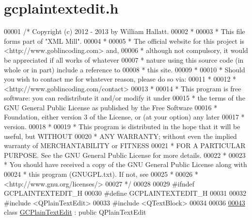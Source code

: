 \hypertarget{gcplaintextedit_8h_source}{\section{gcplaintextedit.\-h}
}

\begin{DoxyCode}
00001 \textcolor{comment}{/* Copyright (c) 2012 - 2013 by William Hallatt.}
00002 \textcolor{comment}{ *}
00003 \textcolor{comment}{ * This file forms part of "XML Mill".}
00004 \textcolor{comment}{ *}
00005 \textcolor{comment}{ * The official website for this project is <http://www.goblincoding.com> and,}
00006 \textcolor{comment}{ * although not compulsory, it would be appreciated if all works of whatever}
00007 \textcolor{comment}{ * nature using this source code (in whole or in part) include a reference to}
00008 \textcolor{comment}{ * this site.}
00009 \textcolor{comment}{ *}
00010 \textcolor{comment}{ * Should you wish to contact me for whatever reason, please do so via:}
00011 \textcolor{comment}{ *}
00012 \textcolor{comment}{ *                 <http://www.goblincoding.com/contact>}
00013 \textcolor{comment}{ *}
00014 \textcolor{comment}{ * This program is free software: you can redistribute it and/or modify it
       under}
00015 \textcolor{comment}{ * the terms of the GNU General Public License as published by the Free
       Software}
00016 \textcolor{comment}{ * Foundation, either version 3 of the License, or (at your option) any later}
00017 \textcolor{comment}{ * version.}
00018 \textcolor{comment}{ *}
00019 \textcolor{comment}{ * This program is distributed in the hope that it will be useful, but WITHOUT}
00020 \textcolor{comment}{ * ANY WARRANTY; without even the implied warranty of MERCHANTABILITY or
       FITNESS}
00021 \textcolor{comment}{ * FOR A PARTICULAR PURPOSE.  See the GNU General Public License for more
       details.}
00022 \textcolor{comment}{ *}
00023 \textcolor{comment}{ * You should have received a copy of the GNU General Public License along with}
00024 \textcolor{comment}{ * this program (GNUGPL.txt).  If not, see}
00025 \textcolor{comment}{ *}
00026 \textcolor{comment}{ *                    <http://www.gnu.org/licenses/>}
00027 \textcolor{comment}{ */}
00028 
00029 \textcolor{preprocessor}{#ifndef GCPLAINTEXTEDIT\_H}
00030 \textcolor{preprocessor}{}\textcolor{preprocessor}{#define GCPLAINTEXTEDIT\_H}
00031 \textcolor{preprocessor}{}
00032 \textcolor{preprocessor}{#include <QPlainTextEdit>}
00033 \textcolor{preprocessor}{#include <QTextBlock>}
00034 
00036 
\hypertarget{gcplaintextedit_8h_source_l00043}{}\hyperlink{class_g_c_plain_text_edit}{00043} \textcolor{keyword}{class }\hyperlink{class_g_c_plain_text_edit}{GCPlainTextEdit} : \textcolor{keyword}{public} QPlainTextEdit

\end{DoxyCode}
